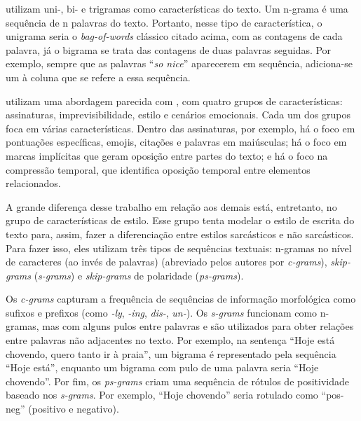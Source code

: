 \cite{liebrecht:2013:perfect-solution} utilizam uni-, bi- e trigramas como
características do texto. Um n-grama é uma sequência de n palavras do texto.
Portanto, nesse tipo de característica, o unigrama seria o \textit{bag-of-words}
clássico citado acima, com as contagens de cada palavra, já o bigrama se trata
das contagens de duas palavras seguidas. Por exemplo, sempre que as palavras
``\textit{so nice}'' aparecerem em sequência, adiciona-se um à coluna que se
refere a essa sequência.

\cite{reyes:2013:multidimensional-approach} utilizam uma abordagem parecida com
\cite{reyes:2012:from-humor}, com quatro grupos de características: assinaturas,
imprevisibilidade, estilo e cenários emocionais. Cada um dos grupos foca em
várias características. Dentro das assinaturas, por exemplo, há o foco em
pontuações específicas, emojis, citações e palavras em maiúsculas; há o foco em
marcas implícitas que geram oposição entre partes do texto; e há o foco na
compressão temporal, que identifica oposição temporal entre elementos
relacionados.

A grande diferença desse trabalho em relação aos demais está, entretanto, no
grupo de características de estilo. Esse grupo tenta modelar o estilo de escrita
do texto para, assim, fazer a diferenciação entre estilos sarcásticos e não
sarcásticos. Para fazer isso, eles utilizam três tipos de sequências textuais:
n-gramas no nível de caracteres (ao invés de palavras) (abreviado pelos autores
por \textit{c-grams}), \textit{skip-grams} (\textit{s-grams}) e
\textit{skip-grams} de polaridade (\textit{ps-grams}).

Os \textit{c-grams} capturam a frequência de sequências de informação
morfológica como sufixos e prefixos (como \textit{-ly}, \textit{-ing},
\textit{dis-}, \textit{un-}). Os \textit{s-grams} funcionam como n-gramas, mas
com alguns pulos entre palavras e são utilizados para obter relações entre
palavras não adjacentes no texto. Por exemplo, na sentença ``Hoje está chovendo,
quero tanto ir à praia'', um bigrama é representado pela sequência ``Hoje
está'', enquanto um bigrama com pulo de uma palavra seria ``Hoje chovendo''. Por
fim, os \textit{ps-grams} criam uma sequência de rótulos de positividade baseado
nos \textit{s-grams}. Por exemplo, ``Hoje chovendo'' seria rotulado como
``pos-neg'' (positivo e negativo).

